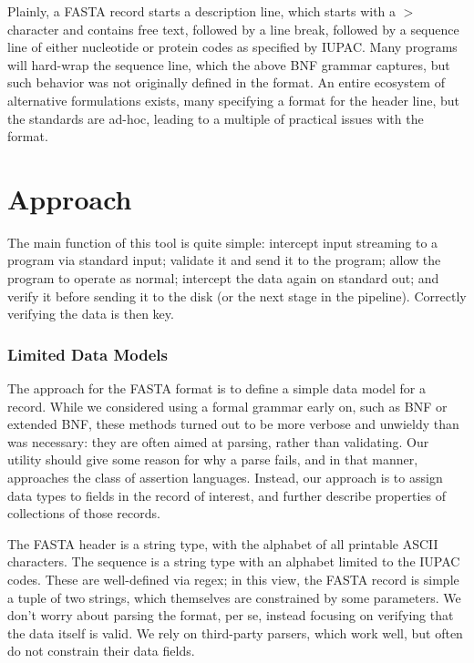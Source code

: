 \documentclass[12pt]{article} %
\begin{document}
Plainly, a FASTA record starts a description line, which starts with a $>$ character
and contains free text, followed by a line break, followed by a sequence line
of either nucleotide or protein codes as specified by IUPAC. Many programs will
hard-wrap the sequence line, which the above BNF grammar captures, but such
behavior was not originally defined in the format. An entire ecosystem of alternative
formulations exists, many specifying a format for the header line, but the standards
are ad-hoc, leading to a multiple of practical issues with the format.

\section{Approach}

The main function of this tool is quite simple: intercept input streaming to a program
via standard input; validate it and send it to the program; allow the program to operate
as normal; intercept the data again on standard out; and verify it before sending it to
the disk (or the next stage in the pipeline). Correctly verifying the data is then key.

\subsubsection{Limited Data Models}

The approach for the FASTA format is to define a simple data model for a record.
While we considered using a formal grammar early on, such as BNF or extended BNF,
these methods turned out to be more verbose and unwieldy than was necessary: 
they are often aimed at parsing, rather than validating. Our utility should give
some reason for why a parse fails, and in that manner, approaches the class
of assertion languages. Instead, our approach is to assign data types to
fields in the record of interest, and further describe properties of collections of those
records.

The FASTA header is a string type, with the alphabet of all printable ASCII characters.
The sequence is a string type with an alphabet limited to the IUPAC codes. These 
are well-defined via regex; in this view, the FASTA record is simple a tuple of two
strings, which themselves are constrained by some parameters. We don't worry about
parsing the format, per se, instead focusing on verifying that the data itself is valid.
We rely on third-party parsers, which work well, but often do not constrain their data
fields.
\end{document}
